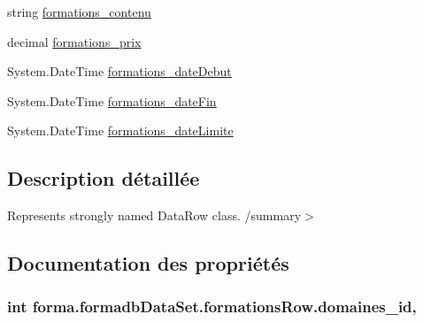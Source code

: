 \begin{DoxyCompactItemize}
\item 
string \hyperlink{classforma_1_1formadb_data_set_1_1formations_row_abaa617416c49f8396f1bd9cd4567e20f}{formations\+\_\+contenu}
\item 
decimal \hyperlink{classforma_1_1formadb_data_set_1_1formations_row_a611eec6099c7039891433f8ba387e812}{formations\+\_\+prix}
\item 
System.\+Date\+Time \hyperlink{classforma_1_1formadb_data_set_1_1formations_row_ab74bc904a80b0668e5ab8af854fc7a94}{formations\+\_\+date\+Debut}
\item 
System.\+Date\+Time \hyperlink{classforma_1_1formadb_data_set_1_1formations_row_aeb8923e96c5dd009ba2df4ffa12769f0}{formations\+\_\+date\+Fin}
\item 
System.\+Date\+Time \hyperlink{classforma_1_1formadb_data_set_1_1formations_row_a3ad63fc09b10e900426a81e1c2aa9f18}{formations\+\_\+date\+Limite}
\end{DoxyCompactItemize}


\subsection{Description détaillée}
Represents strongly named Data\+Row class. /summary$>$ 

\subsection{Documentation des propriétés}
\subsubsection[{\texorpdfstring{domaines\+\_\+id}{domaines_id}}]{\setlength{\rightskip}{0pt plus 5cm}int forma.\+formadb\+Data\+Set.\+formations\+Row.\+domaines\+\_\+id\hspace{0.3cm}{\ttfamily [get]}, {\ttfamily [set]}}\hypertarget{classforma_1_1formadb_data_set_1_1formations_row_af2dadc9c74f0010ee05a55145c1d374f}{}\label{classforma_1_1formadb_data_set_1_1formations_row_af2dadc9c74f0010ee05a55145c1d374f}
